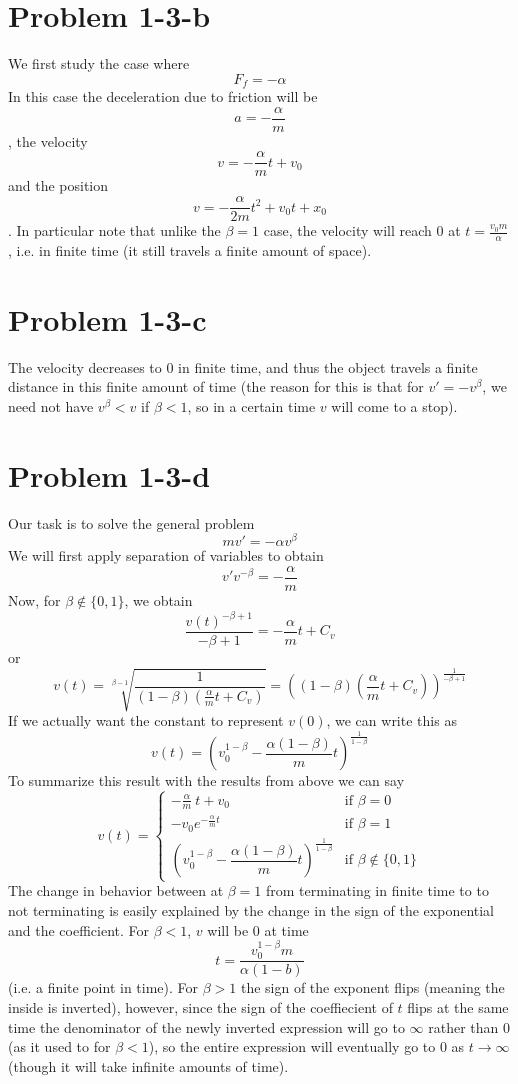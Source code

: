 \section*{Problem 1-3-b}
We first study the case where
\[ F_f = -\alpha \]
In this case the deceleration due to friction will be
\[ a = -\frac{\alpha}{m} \]
, the velocity
\[ v = -\frac{\alpha}{m}t + v_0 \]
and the position
\[ v = -\frac{\alpha}{2m}t^2 + v_0t + x_0 \].
In particular note that unlike the $\beta = 1$ case, the velocity will reach $0$ at $t=\frac{v_0m}{\alpha}$, i.e. in finite time (it still travels a finite amount of space).
\section*{Problem 1-3-c}
The velocity decreases to $0$ in finite time, and thus the object travels a finite distance in this finite amount of time (the reason for this is that for $v'=-v^\beta$, we need not have $v^\beta<v$ if $\beta<1$, so in a certain time $v$ will come to a stop).
\section*{Problem 1-3-d}
Our task is to solve the general problem \[ mv' = -\alpha v^\beta \]
We will first apply separation of variables to obtain
\[ v'v^{-\beta} = -\frac{\alpha}{m} \]
 Now, for $\beta \notin \{0,1\}$, we obtain
 \[ \dfrac{v(t)^{-\beta+1}}{-\beta+1}=-\frac{\alpha}{m}t+C_v \]
 or 
 \[ v(t) = \sqrt[\beta-1]{\frac{1}{(1-\beta)\left(\frac{\alpha}{m}t+C_v\right)}} = \left((1-\beta)\left(\frac{\alpha}{m}t+C_v\right)\right)^{\frac{1}{-\beta+1}} \]
 If we actually want the constant to represent $v(0)$, we can write this as
 \[ v(t) = \left(v_0^{1-\beta}-\dfrac{\alpha(1-\beta)}{m}t\right)^{\frac{1}{1-\beta}} \]
 To summarize this result with the results from above we can say
 \[ v(t) = \begin{cases} -\frac{\alpha}{m}\ t + v_0 &\mbox{if } \beta = 0 \\ 
-v_0e^{-\frac{\alpha}{m} t} & \mbox{if }  \beta = 1 \\
\left(v_0^{1-\beta}-\dfrac{\alpha(1-\beta)}{m}t\right)^{\frac{1}{1-\beta}} & \mbox{if } \beta \notin \{0,1\} \end{cases}  \]
The change in behavior between at $\beta = 1$ from terminating in finite time to to not terminating is easily explained by the change in the sign of the exponential and the coefficient. For $\beta<1$, $v$ will be $0$ at time 
\[ t = \dfrac{v_0^{1-\beta}m}{\alpha(1-b)} \]
(i.e. a finite point in time). For $\beta>1$ the sign of the exponent flips (meaning the inside is inverted), however, since the sign of the coeffiecient of $t$ flips at the same time the denominator of the newly inverted expression will go to $\infty$ rather than $0$ (as it used to for $\beta < 1$), so the entire expression will eventually go to $0$ as $t\to\infty$ (though it will take infinite amounts of time).
